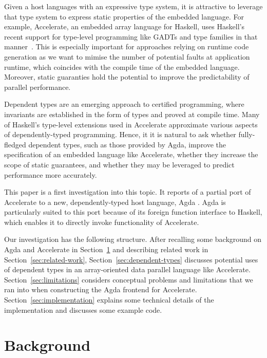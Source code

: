 \documentclass{llncs}
\begin{document}
Given a host languages with an expressive type system, it is attractive to leverage that type system to express static properties of the embedded language. For example, Accelerate, an embedded array language for Haskell, uses Haskell's recent support for type-level programming like GADTs and type families in that manner~\cite{ChakravartyKellerLeeMcdonellGrover2011}. This is especially important for approaches relying on runtime code generation as we want to mimise the number of potential faults at application runtime, which coincides with the compile time of the embedded language. Moreover, static guaranties hold the potential to improve the predictability of parallel performance.

Dependent types are an emerging approach to certified programming, where invariants are established in the form of types and proved at compile time. Many of Haskell's type-level extensions used in Accelerate approximate various aspects of dependently-typed programming. Hence, it it is natural to ask whether fully-fledged dependent types, such as those provided by Agda, improve the specification of an embedded language like Accelerate, whether they increase the scope of static guarantees, and whether they may be leveraged to predict performance more accurately.

This paper is a first investigation into this topic. It reports of a
partial port of Accelerate to a new, dependently-typed host language,
Agda \cite{Norell2008,BoveDybjerNorell2009}. Agda is particularly
suited to this port because of its foreign function interface to
Haskell, which enables it to directly invoke functionality of
Accelerate. 

Our investigation has the following structure. After recalling some
background on Agda and Accelerate in Section~\ref{sec:background} and
describing related work in Section~\ref{sec:related-work}, 
Section~\ref{sec:dependent-types} discusses potential uses of
dependent types in an array-oriented data parallel language like
Accelerate. Section~\ref{sec:limitations} considers conceptual
problems and limitations that we ran into when constructing the Agda
frontend for Accelerate. Section~\ref{sec:implementation} explains
some technical details of the implementation and discusses some
example code. 

\section{Background}
\label{sec:background}
\end{document}

